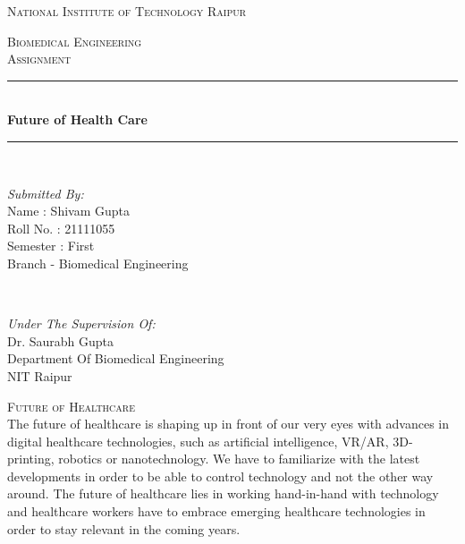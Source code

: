 \documentclass[12pt]{article}
\begin{document}
\begin{titlepage}
\newcommand{\HRule}{\rule{\linewidth}{0.5mm}}
\center
\textsc{\LARGE National Institute of Technology Raipur}\\[1.0cm]
\begin{figure}[h]
\centering

\end{figure}
\textsc{\Large Biomedical Engineering}\\[0.5cm] 
\textsc{\large Assignment}\\[0.5cm]
\HRule\\[0.4cm]
	
	{\huge\bfseries Future of Health Care}\\[0.1cm]
	\HRule\\[1.1cm]
	\begin{minipage}{0.4\textwidth}
		\begin{flushleft}
			\large
			\textit{Submitted By:}\\
          		Name : Shivam Gupta \\
			   Roll No. : 21111055\\
			   Semester : First\\
			   Branch - Biomedical Engineering 
			   
			\end{flushleft}
	\end{minipage}
	~
	\begin{minipage}{0.5\textwidth}
		\begin{flushright}
			\large
			\textit{Under The Supervision Of:}\\
			Dr. Saurabh Gupta\\
			Department Of Biomedical Engineering\\
			NIT Raipur
		\end{flushright}
	\end{minipage}
	\vfill\vfill\vfill 
	
	
	\vfill 
\end{titlepage}



\clearpage
\newpage


\textsc{\Large Future of Healthcare}\\[1.5cm]
The future of healthcare is shaping up in front of our very eyes with advances in digital healthcare technologies, such as artificial intelligence, VR/AR, 3D-printing, robotics or nanotechnology. We have to familiarize with the latest developments in order to be able to control technology and not the other way around. The future of healthcare lies in working hand-in-hand with technology and healthcare workers have to embrace emerging healthcare technologies in order to stay relevant in the coming years.
\end{document}
